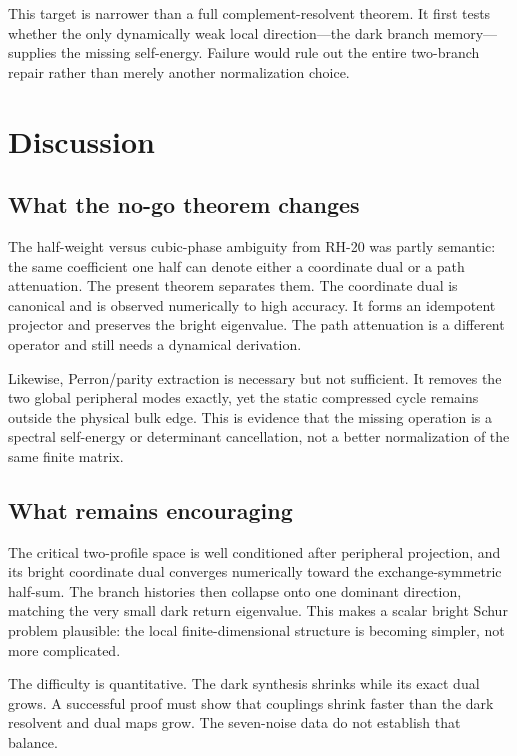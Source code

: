 \documentclass[11pt]{article}
\theoremstyle{definition}
\theoremstyle{remark}
\begin{document}
This target is narrower than a full complement-resolvent theorem.  It first
tests whether the only dynamically weak local direction---the dark branch
memory---supplies the missing self-energy.  Failure would rule out the entire
two-branch repair rather than merely another normalization choice.

\section{Discussion}
\label{sec:discussion}

\subsection{What the no-go theorem changes}

The half-weight versus cubic-phase ambiguity from RH-20 was partly semantic:
the same coefficient one half can denote either a coordinate dual or a path
attenuation.  The present theorem separates them.  The coordinate dual is
canonical and is observed numerically to high accuracy.  It forms an
idempotent projector and preserves the bright eigenvalue.  The path
attenuation is a different operator and still needs a dynamical derivation.

Likewise, Perron/parity extraction is necessary but not sufficient.  It
removes the two global peripheral modes exactly, yet the static compressed
cycle remains outside the physical bulk edge.  This is evidence that the
missing operation is a spectral self-energy or determinant cancellation, not
a better normalization of the same finite matrix.

\subsection{What remains encouraging}

The critical two-profile space is well conditioned after peripheral
projection, and its bright coordinate dual converges numerically toward the
exchange-symmetric half-sum.  The branch histories then collapse onto one
dominant direction, matching the very small dark return eigenvalue.  This
makes a scalar bright Schur problem plausible: the local finite-dimensional
structure is becoming simpler, not more complicated.

The difficulty is quantitative.  The dark synthesis shrinks while its exact
dual grows.  A successful proof must show that couplings shrink faster than
the dark resolvent and dual maps grow.  The seven-noise data do not establish
that balance.
\end{document}
